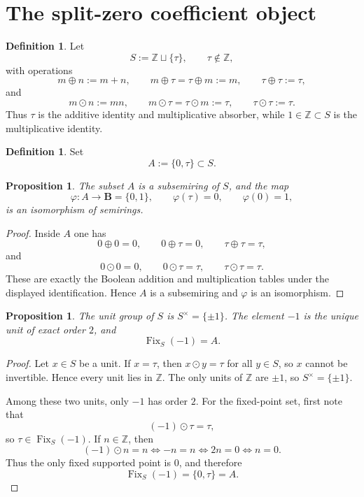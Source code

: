 \documentclass[11pt,a4paper]{article}
\numberwithin{equation}{section}
\newtheorem{proposition}[theorem]{Proposition}
\theoremstyle{definition}
\newtheorem{definition}[theorem]{Definition}
\theoremstyle{remark}
\DeclareMathOperator{\Fix}{Fix}
\newcommand{\ZZ}{\mathbb Z}
\newcommand{\BB}{\mathbf B}
\newcommand{\taup}{\tau}
\begin{document}
\section{The split-zero coefficient object}

\begin{definition}
Let
\[
S:=\ZZ\sqcup\{\taup\},\qquad \taup\notin \ZZ,
\]
with operations
\[
m\oplus n:=m+n,
\qquad
m\oplus\taup=\taup\oplus m:=m,
\qquad
\taup\oplus\taup:=\taup,
\]
and
\[
m\odot n:=mn,
\qquad
m\odot\taup=\taup\odot m:=\taup,
\qquad
\taup\odot\taup:=\taup.
\]
Thus $\taup$ is the additive identity and multiplicative absorber, while $1\in\ZZ\subset S$ is the multiplicative identity.
\end{definition}

\begin{definition}
Set
\[
A:=\{0,\taup\}\subset S.
\]
\end{definition}

\begin{proposition}\label{P3:prop:boolean-pair}
The subset $A$ is a subsemiring of $S$, and the map
\[
\varphi:A\longrightarrow \BB=\{0,1\},
\qquad
\varphi(\taup)=0,
\qquad
\varphi(0)=1,
\]
is an isomorphism of semirings.
\end{proposition}

\begin{proof}
Inside $A$ one has
\[
0\oplus 0=0,
\qquad
0\oplus\taup=0,
\qquad
\taup\oplus\taup=\taup,
\]
and
\[
0\odot 0=0,
\qquad
0\odot\taup=\taup,
\qquad
\taup\odot\taup=\taup.
\]
These are exactly the Boolean addition and multiplication tables under the displayed identification.  Hence $A$ is a subsemiring and $\varphi$ is an isomorphism.
\end{proof}

\begin{proposition}\label{P3:prop:units-fixed}
The unit group of $S$ is $S^\times=\{\pm 1\}$.  The element $-1$ is the unique unit of exact order $2$, and
\[
\Fix_S(-1)=A.
\]
\end{proposition}

\begin{proof}
Let $x\in S$ be a unit.  If $x=\taup$, then $x\odot y=\taup$ for all $y\in S$, so $x$ cannot be invertible.  Hence every unit lies in $\ZZ$.  The only units of $\ZZ$ are $\pm1$, so $S^\times=\{\pm1\}$.

Among these two units, only $-1$ has order $2$.  For the fixed-point set, first note that
\[
(-1)\odot\taup=\taup,
\]
so $\taup\in\Fix_S(-1)$.  If $n\in\ZZ$, then
\[
(-1)\odot n=n
\iff -n=n
\iff 2n=0
\iff n=0.
\]
Thus the only fixed supported point is $0$, and therefore
\[
\Fix_S(-1)=\{0,\taup\}=A.
\]
\end{proof}
\end{document}

